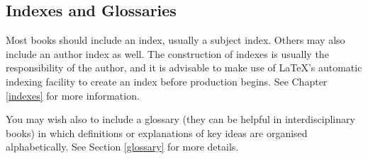 \subsection{Indexes and Glossaries}
Most books should include an index, usually a subject index. Others may also
include an author index as well. The construction of indexes is usually the responsibility
of the author, and it is advisable to make use of {\LaTeX}'s automatic indexing facility
to create an index before production begins.
See Chapter \ref{indexes} for more information.

You may wish also to include a glossary (they can be helpful in interdisciplinary books)
in which definitions or explanations of key 
ideas are organised alphabetically. See Section \ref{glossary} for more details.

\endinput
